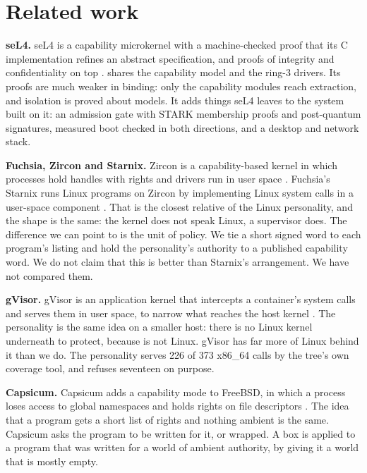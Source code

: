\section{Related work}\label{sec:related}

\textbf{seL4.} seL4 is a capability microkernel with a machine-checked proof that its C implementation refines an abstract specification, and proofs of integrity and confidentiality on top \cite{sel4,sel4info}. \nonos{} shares the capability model and the ring-3 drivers. Its proofs are much weaker in binding: only the capability modules reach extraction, and isolation is proved about models. It adds things seL4 leaves to the system built on it: an admission gate with STARK membership proofs and post-quantum signatures, measured boot checked in both directions, and a desktop and network stack.

\textbf{Fuchsia, Zircon and Starnix.} Zircon is a capability-based kernel in which processes hold handles with rights and drivers run in user space \cite{zircon}. Fuchsia's Starnix runs Linux programs on Zircon by implementing Linux system calls in a user-space component \cite{starnix}. That is the closest relative of the Linux personality, and the shape is the same: the kernel does not speak Linux, a supervisor does. The difference we can point to is the unit of policy. We tie a short signed word to each program's listing and hold the personality's authority to a published capability word. We do not claim that this is better than Starnix's arrangement. We have not compared them.

\textbf{gVisor.} gVisor is an application kernel that intercepts a container's system calls and serves them in user space, to narrow what reaches the host kernel \cite{gvisor}. The personality is the same idea on a smaller host: there is no Linux kernel underneath to protect, because \nonos{} is not Linux. gVisor has far more of Linux behind it than we do. The personality serves 226 of 373 x86\_64 calls by the tree's own coverage tool, and refuses seventeen on purpose.

\textbf{Capsicum.} Capsicum adds a capability mode to FreeBSD, in which a process loses access to global namespaces and holds rights on file descriptors \cite{capsicum}. The idea that a program gets a short list of rights and nothing ambient is the same. Capsicum asks the program to be written for it, or wrapped. A \nonos{} box is applied to a program that was written for a world of ambient authority, by giving it a world that is mostly empty.

